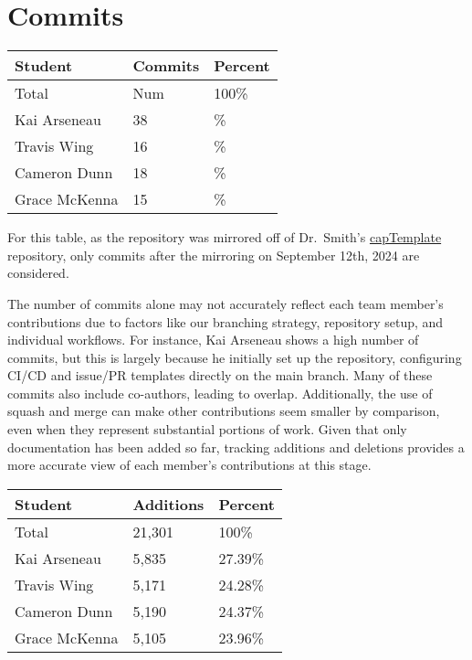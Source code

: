 \documentclass{article}
\begin{document}
\section{Commits}



\begin{table}[H]
\centering
\begin{tabular}{lll}
\toprule
\textbf{Student} & \textbf{Commits} & \textbf{Percent}\\
\midrule
Total & Num & 100\% \\
Kai Arseneau & 38 & \% \\
Travis Wing & 16 & \% \\
Cameron Dunn & 18 & \% \\
Grace McKenna & 15 & \% \\
\bottomrule
\end{tabular}
\end{table}

For this table, as the repository was mirrored off of Dr.~Smith's \href{https://github.com/smiths/capTemplate}{capTemplate} repository, only commits after the mirroring on September 12th, 2024 are considered.

The number of commits alone may not accurately reflect each team member’s contributions due to factors like our branching strategy, repository setup, and individual workflows. For instance, Kai Arseneau shows a high number of commits, but this is largely because he initially set up the repository, configuring CI/CD and issue/PR templates directly on the main branch. Many of these commits also include co-authors, leading to overlap. Additionally, the use of squash and merge can make other contributions seem smaller by comparison, even when they represent substantial portions of work. Given that only documentation has been added so far, tracking additions and deletions provides a more accurate view of each member's contributions at this stage.
\begin{table}[H]
  \centering
  \begin{tabular}{lll}
  \toprule
  \textbf{Student} & \textbf{Additions} & \textbf{Percent}\\
  \midrule
  Total & 21,301 & 100\% \\
  Kai Arseneau & 5,835 & 27.39\% \\
  Travis Wing & 5,171 & 24.28\% \\
  Cameron Dunn & 5,190 & 24.37\% \\
  Grace McKenna & 5,105 & 23.96\% \\
  \bottomrule
  \end{tabular}
\end{table}
\end{document}
